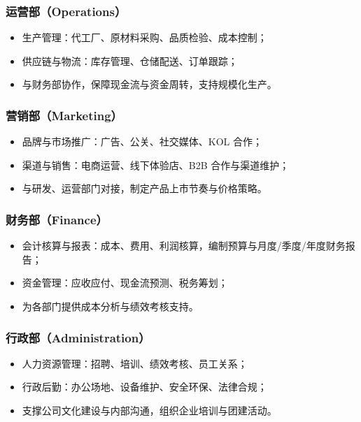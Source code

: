 \documentclass[UTF8]{report}
\theoremstyle{MyLineTheoremStyle} %
\theoremstyle{MyBlockTheoremStyle} %
\theoremstyle{MySubsubsectionStyle} %
\begin{document}
  \subsubsection{运营部（Operations）}
    \begin{itemize}
      \item 生产管理：代工厂、原材料采购、品质检验、成本控制；  
      \item 供应链与物流：库存管理、仓储配送、订单跟踪；  
      \item 与财务部协作，保障现金流与资金周转，支持规模化生产。
    \end{itemize}

  \subsubsection{营销部（Marketing）}
    \begin{itemize}
      \item 品牌与市场推广：广告、公关、社交媒体、KOL 合作；  
      \item 渠道与销售：电商运营、线下体验店、B2B 合作与渠道维护；  
      \item 与研发、运营部门对接，制定产品上市节奏与价格策略。
    \end{itemize}

  \subsubsection{财务部（Finance）}
    \begin{itemize}
      \item 会计核算与报表：成本、费用、利润核算，编制预算与月度/季度/年度财务报告；  
      \item 资金管理：应收应付、现金流预测、税务筹划；  
      \item 为各部门提供成本分析与绩效考核支持。
    \end{itemize}

  \subsubsection{行政部（Administration）}
    \begin{itemize}
      \item 人力资源管理：招聘、培训、绩效考核、员工关系；  
      \item 行政后勤：办公场地、设备维护、安全环保、法律合规；  
      \item 支撑公司文化建设与内部沟通，组织企业培训与团建活动。
    \end{itemize}
\end{document}

